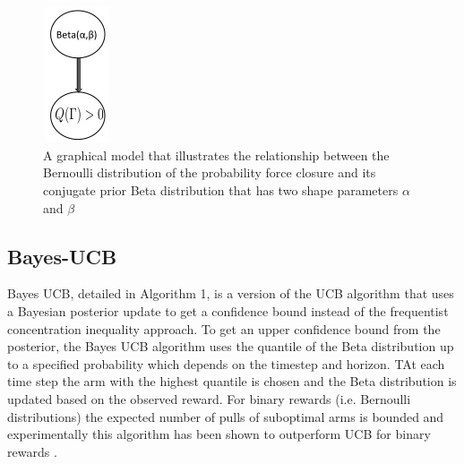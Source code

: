 \documentclass[journal,transmag]{IEEEtran}%
\begin{document}
\begin{figure}[ht!]
\centering
\includegraphics[width = 2cm, height = 4cm]{figures/Slide9.jpg}
\caption{A graphical model that illustrates the relationship between the Bernoulli distribution of the probability force closure and its conjugate prior Beta distribution that has two shape parameters $\alpha$ and $\beta$ }
\vspace*{-10pt}
\label{fig:beta_model}
\end{figure}






\subsection{Bayes-UCB}
Bayes UCB, detailed in Algorithm 1, is a version of the UCB algorithm that uses a Bayesian posterior update to get a confidence bound instead of  the frequentist concentration inequality approach. To get an upper confidence bound from the posterior, the Bayes UCB algorithm uses the quantile of the Beta distribution up to a specified probability which depends on the timestep and horizon. TAt each time step the arm with the highest quantile is chosen and the Beta distribution is updated based on the observed reward.  For binary rewards (i.e. Bernoulli distributions) the expected number of pulls of suboptimal arms is bounded and experimentally this algorithm has been shown to outperform UCB for binary rewards \cite{kaufmann2012bayesian}.
\end{document}

